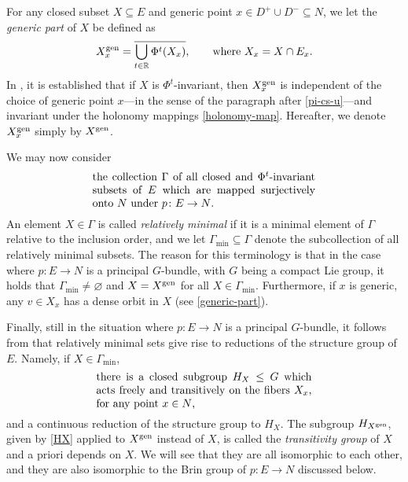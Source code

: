 \documentclass[10pt,a4paper]{amsart}
\newcommand{\R}{\mathbb{R}}
\numberwithin{equation}{section}
\theoremstyle{definition}
\begin{document}
For any closed subset $X\subseteq E$ and generic point $x\in D^+\cup D^-\subseteq N$, we let the \emph{generic part} of $X$ be defined as
\begin{equation}\label{generic-part}
 X^{\rm gen}_x = \overline{\bigcup_{t\in \R} \Phi^t(X_x)},\qquad \mbox{where } X_x = X \cap E_x.
\end{equation}In \cite[Proposition 2.2.10]{filip2024finiteness}, it is established that if $X$ is $\Phi^t$-invariant, then $X^{\rm gen}_x$ is independent of the choice of generic point $x$---in the sense of the paragraph after \eqref{pi-cs-u}---and invariant under the holonomy mappings \eqref{holonomy-map}. Hereafter, we denote $X^{\rm gen}_x$ simply by $X^{\rm gen}$.

We may now consider \begin{equation}\label{defn-Gamma}
 \parbox{.59\textwidth}{the collection $\Gamma$ of all closed and $\Phi^t$-invariant subsets of $E$ which are mapped surjectively onto $N$ under $p\colon E\to N$.}
\end{equation} An element $X\in \Gamma$ is called \emph{relatively minimal} if it is a minimal element of $\Gamma$ relative to the inclusion order, and we let $\Gamma_{\min}\subseteq \Gamma$ denote the subcollection of all relatively minimal subsets. The reason for this terminology is that in the case where $p\colon E\to N$ is a principal $G$-bundle, with $G$ being a compact Lie group, it holds that $\Gamma_{\min}\neq \varnothing$ and $X = X^{\rm gen}$ for all $X\in \Gamma_{\min}$. Furthermore, if $x$ is generic, any $v\in X_x$ has a dense orbit in $X$ (see \eqref{generic-part}).

Finally, still in the situation where $p\colon E\to N$ is a principal $G$-bundle, it follows from \cite[Propositions 2.2.16 and 2.2.18 and Corollary 2.2.17]{filip2024finiteness} that relatively minimal sets give rise to reductions of the structure group of $E$. Namely, if $X\in \Gamma_{\min}$,
\begin{equation}\label{HX}
 \parbox{.57\textwidth}{there is a closed subgroup $H_X\leq G$ which acts freely and transitively on the fibers $X_x$, for any point $x\in N$,}
\end{equation}and a continuous reduction of the structure group to $H_X$. The subgroup $H_{X^{\rm gen}}$, given by \eqref{HX} applied to $X^{\rm gen}$ instead of $X$, is called the \emph{transitivity group} of $X$ and a priori depends on $X$. We will see that they are all isomorphic to each other, and they are also isomorphic to the Brin group of $p\colon E\to N$ discussed below.
\end{document}
